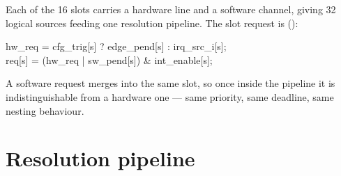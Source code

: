 Each of the 16 slots carries a hardware line and a software channel, giving 32
logical sources feeding one resolution pipeline. The slot request is
():

\begin{center}
\ttfamily\small
hw\_req = cfg\_trig[s] ? edge\_pend[s] : irq\_src\_i[s];\\
req[s]  = (hw\_req | sw\_pend[s]) \& int\_enable[s];
\end{center}

A software request merges into the same slot, so once inside the pipeline it is
indistinguishable from a hardware one --- same priority, same deadline, same
nesting behaviour.

\section{Resolution pipeline}


